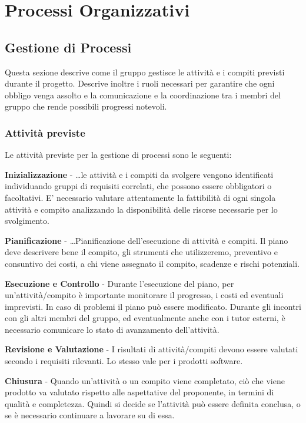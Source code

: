 \documentclass[12pt, a4paper]{article}
\begin{document}
\section{Processi Organizzativi}

\subsection{Gestione di Processi}

Questa sezione descrive come il gruppo gestisce le attività e i compiti
previsti durante il progetto. Descrive inoltre i ruoli necessari per
garantire che ogni obbligo venga assolto e la comunicazione e la
coordinazione tra i membri del gruppo che rende possibili progressi
notevoli.

\subsubsection{Attività previste}

Le attività previste per la gestione di processi sono le seguenti:

\textbf{Inizializzazione} - \ldots le attività e i compiti da svolgere
vengono identificati individuando gruppi di requisiti correlati, che
possono essere obbligatori o facoltativi. E' necessario valutare
attentamente la fattibilità di ogni singola attività e compito
analizzando la disponibilità delle risorse necessarie per lo
svolgimento.

\textbf{Pianificazione} - \ldots Pianificazione dell'esecuzione di
attività e compiti. Il piano deve descrivere bene il compito, gli
strumenti che utilizzeremo, preventivo e consuntivo dei costi, a chi
viene assegnato il compito, scadenze e rischi potenziali.

\textbf{Esecuzione e Controllo} - Durante l'esecuzione del piano, per
un'attività/compito è importante monitorare il progresso, i costi ed
eventuali imprevisti. In caso di problemi il piano può essere
modificato. Durante gli incontri con gli altri membri del gruppo, ed
eventualmente anche con i tutor esterni, è necessario comunicare lo
stato di avanzamento dell'attività.

\textbf{Revisione e Valutazione} - I risultati di attività/compiti
devono essere valutati secondo i requisiti rilevanti. Lo stesso vale per
i prodotti software.

\textbf{Chiusura} - Quando un'attività o un compito viene completato,
ciò che viene prodotto va valutato rispetto alle aspettative del
proponente, in termini di qualità e completezza. Quindi si decide se
l'attività può essere definita conclusa, o se è necessario continuare a
lavorare su di essa.
\end{document}
